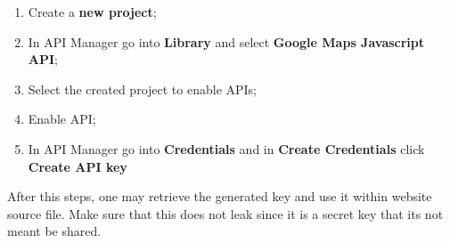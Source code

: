 \begin{enumerate}
	\item Create a \textbf{new project};
	\item In API Manager go into \textbf{Library} and select \textbf{Google Maps Javascript API};
	\item Select the created project to enable APIs;
	\item Enable API;
	\item In API Manager go into \textbf{Credentials} and in \textbf{Create Credentials} click \textbf{Create API key}	
\end{enumerate}

After this steps, one may retrieve the generated key and use it within website source file. Make sure that this does not leak since it is a secret key that its not meant be shared.